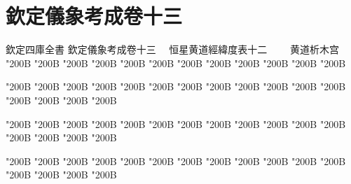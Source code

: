\chapter*{欽定儀象考成卷十三}
\begin{正文}
欽定四庫全書
欽定儀象考成卷十三
　恒星黄道經緯度表十二
　　黄道析木宫
\char"200B\relax{}
\char"200B\relax{}
\char"200B\relax{}
\char"200B\relax{}
\char"200B\relax{}
\char"200B\relax{}
\char"200B\relax{}
\char"200B\relax{}
\char"200B\relax{}
\char"200B\relax{}
\char"200B\relax{}
\char"200B\relax
\par
\end{正文}\clearpage
{}
\begin{正文}
\char"200B\relax{}
\char"200B\relax{}
\char"200B\relax{}
\char"200B\relax{}
\char"200B\relax{}
\char"200B\relax{}
\char"200B\relax{}
\char"200B\relax{}
\char"200B\relax{}
\char"200B\relax{}
\char"200B\relax{}
\char"200B\relax{}
\char"200B\relax{}
\char"200B\relax{}
\char"200B\relax{}
\char"200B\relax
{}\par
\end{正文}\clearpage
{}
\begin{正文}
\char"200B\relax{}
\char"200B\relax{}
\char"200B\relax{}
\char"200B\relax{}
\char"200B\relax{}
\char"200B\relax{}
\char"200B\relax{}
\char"200B\relax{}
\char"200B\relax{}
\char"200B\relax{}
\char"200B\relax{}
\char"200B\relax{}
\char"200B\relax{}
\char"200B\relax{}
\char"200B\relax{}
\char"200B\relax
{}\par
\end{正文}\clearpage
{}
\begin{正文}
\char"200B\relax{}
\char"200B\relax{}
\char"200B\relax{}
\char"200B\relax{}
\char"200B\relax{}
\char"200B\relax{}
\char"200B\relax{}
\char"200B\relax{}
\char"200B\relax{}
\char"200B\relax{}
\char"200B\relax{}
\char"200B\relax{}
\char"200B\relax{}
\char"200B\relax{}
\char"200B\relax{}
\char"200B\relax
{}\par
\end{正文}\clearpage
